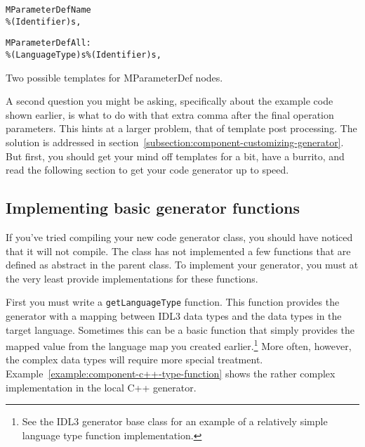 \begin{Example}
\begin{minifbox}
\begin{small}
\begin{alltt}
MParameterDefName
\%(Identifier)s,\textvisiblespace

MParameterDefAll:
\%(LanguageType)s\textvisiblespace\%(Identifier)s,\textvisiblespace
\end{alltt}
\end{small}
\end{minifbox}
\caption{Two possible templates for MParameterDef nodes.}
\label{example:component-two-param-templates}
\end{Example}

A second question you might be asking, specifically about the example code shown
earlier, is what to do with that extra comma after the final operation
parameters. This hints at a larger problem, that of template post processing.
The solution is addressed in
section~\ref{subsection:component-customizing-generator}. But first, you should
get your mind off templates for a bit, have a burrito, and read the following
section to get your code generator up to speed.

\subsection{Implementing basic generator functions}
\label{subsection:component-basic-functionality}

If you've tried compiling your new code generator class, you should have noticed
that it will not compile. The class has not implemented a few functions that are
defined as abstract in the parent class. To implement your generator, you must
at the very least provide implementations for these functions.

First you must write a {\tt getLanguageType} function. This function provides
the generator with a mapping between IDL3 data types and the data types in the
target language. Sometimes this can be a basic function that simply provides the
mapped value from the language map you created earlier.\footnote{See the IDL3
generator base class for an example of a relatively simple language type
function implementation.} More often, however, the complex data types will
require more special treatment.
Example~\ref{example:component-c++-type-function} shows the rather complex
implementation in the local C++ generator.

